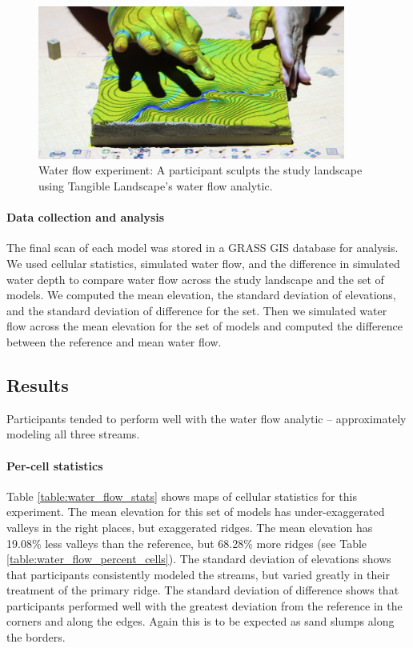 \documentclass[prodmode,acmtochi]{acmsmall} %
\begin{document}
\begin{figure}
\begin{center}
	\includegraphics[width=0.9\textwidth]{images/experiments/tl_water.jpg}
	\caption{Water flow experiment: 
	A participant sculpts the study landscape using Tangible Landscape's water flow
	analytic.}
	\label{fig:flow_sequence}
\end{center}
\end{figure}

\paragraph{Data collection and analysis}
The final scan of each model was stored in a GRASS GIS database for analysis. 
We used cellular statistics, simulated water flow, and the difference in simulated water depth 
to compare water flow across the study landscape and the set of models.
We computed the mean elevation,
the standard deviation of elevations, 
and the standard deviation of difference for the set.
Then we simulated water flow across the mean elevation for the set of models
and computed the difference between the reference and mean water flow. 

\subsection{Results}
Participants tended to perform well with the water flow analytic 
-- approximately modeling all three streams.  

\paragraph{Per-cell statistics}
Table \ref{table:water_flow_stats} shows maps of cellular statistics for this experiment.
The mean elevation for this set of models
has under-exaggerated valleys in the right places, but exaggerated ridges. 
The mean elevation has 19.08\% less valleys than the reference, but
68.28\% more ridges (see Table \ref{table:water_flow_percent_cells}). 
The standard deviation of elevations shows that participants 
consistently modeled the streams, but
varied greatly in their treatment of the primary ridge. 
The standard deviation of difference shows that participants 
performed well 
with the greatest deviation from the reference
in the corners and along the edges. 
Again this is to be expected 
as sand slumps along the borders. 
\end{document}
